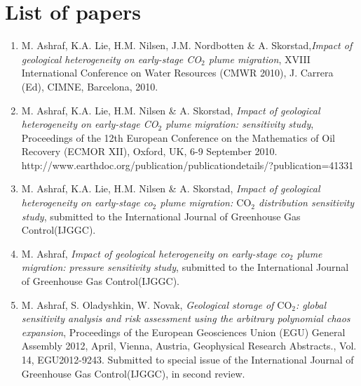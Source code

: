 \chapter{List of papers}

\begin{enumerate}

\item {M. Ashraf, K.A. Lie, H.M. Nilsen, J.M. Nordbotten \& A.
Skorstad},\textit{Impact of geological heterogeneity on early-stage CO$_2$ plume
migration}, XVIII International Conference
on Water Resources (CMWR 2010), J. Carrera (Ed), CIMNE, Barcelona, 2010.

\item {M. Ashraf, K.A. Lie, H.M. Nilsen \& A. Skorstad}, \textit{Impact of
geological heterogeneity on early-stage CO$_2$ plume migration: sensitivity
study}, Proceedings of the 12th European Conference on the Mathematics of
Oil Recovery (ECMOR XII), Oxford, UK, 6-9 September 2010.
\\ http://www.earthdoc.org/publication/publicationdetails/?publication=41331

\item {M. Ashraf, K.A. Lie, H.M. Nilsen \& A. Skorstad}, \textit{Impact of
geological heterogeneity on early-stage co$_2$ plume migration: $\mbox{CO}_2$
distribution sensitivity study}, submitted to the International Journal of
Greenhouse Gas Control(IJGGC). 

\item {M. Ashraf}, \textit{Impact of geological heterogeneity on early-stage
co$_2$ plume migration: pressure sensitivity study}, submitted to the
International Journal of Greenhouse Gas Control(IJGGC).  

\item {M. Ashraf, S. Oladyshkin, W. Novak}, \textit{Geological storage of
$\mbox{CO}_{2}$: global sensitivity analysis and risk assessment using
the arbitrary polynomial chaos expansion}, Proceedings of the European
Geosciences Union (EGU) General Assembly 2012, April, Vienna, Austria,
Geophysical Research Abstracts., Vol. 14, EGU2012-9243. Submitted to special
issue of the International Journal of Greenhouse Gas Control(IJGGC), in second
review.

\end{enumerate}
